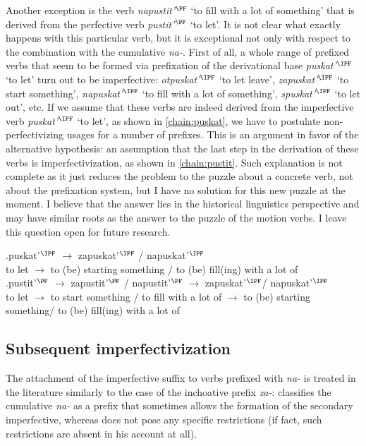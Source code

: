 Another exception is the verb \textit{napustit'$^{\PF}$} `to fill with a lot of something' that is derived from the perfective verb \textit{pustit'$^{\PF}$} `to let'. It is not clear what exactly happens with this particular verb, but it is exceptional not only with respect to the combination with the cumulative \textit{na-}. First of all, a whole range of prefixed verbs that seem to be formed via prefixation of the derivational base \textit{puskat'$^{\IPF}$} `to let' turn out to be imperfective: \textit{otpuskat'$^{\IPF}$} `to let leave', \textit{zapuskat'$^{\IPF}$} `to start something', \textit{napuskat'$^{\IPF}$} `to fill with a lot of something', \textit{spuskat'$^{\IPF}$} `to let out', etc. If we assume that these verbs are indeed derived from the imperfective verb \textit{puskat'$^{\IPF}$} `to let', as shown in \ref{chain:puskat}, we have to postulate non-perfectivizing usages for a number of prefixes. This is an argument in favor of the alternative hypothesis: an assumption that the last step in the derivation of these verbs is imperfectivization, as shown in \ref{chain:pustit}. Such explanation is not complete as it just reduces the problem to the puzzle about a concrete verb, not about the prefixation system, but I have no solution for this new puzzle at the moment. I believe that the answer lies in the historical linguistics perspective and may have similar roots as the answer to the puzzle of the motion verbs. I leave this question open for future research.

\exg.puskat'$^{\IPF}$ $\rightarrow$ zapuskat'$^{\IPF}$ / napuskat'$^{\IPF}$ \label{chain:puskat}\\
{to let} $\rightarrow$ {to (be) starting something} / {to (be) fill(ing) with a lot of}\\

\exg.pustit'$^{\PF}$ $\rightarrow$ zapustit'$^{\PF}$ / napustit'$^{\PF}$ $\rightarrow$ zapuskat'$^{\IPF}$/ napuskat'$^{\IPF}$ \label{chain:pustit}\\
{to let} $\rightarrow$ {to start something} / {to fill with a lot of} $\rightarrow$ {to (be) starting something/} {to (be) fill(ing) with a lot of}\\

\subsection{Subsequent imperfectivization}
The attachment of the imperfective suffix to verbs prefixed with \textit{na-} is treated in the literature similarly to the case of the inchoative prefix \textit{za-}: \citet[230]{Svenonius:04b} classifies the cumulative \textit{na-} as a prefix that sometimes allows the formation of the secondary imperfective, whereas \citet{Tatevosov:09} does not pose any specific restrictions (if fact, such restrictions are absent in his account at all).

